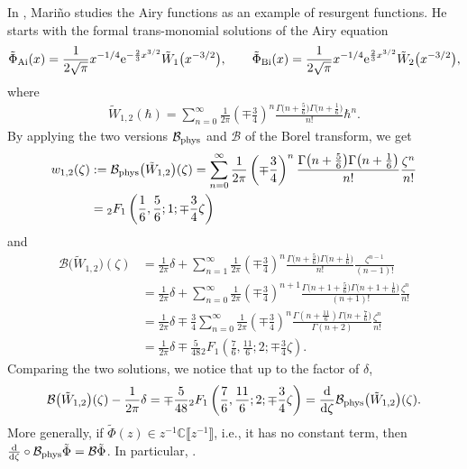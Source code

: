 \documentclass[pdftex]{sigma}
\newcommand{\C}{\mathbb{C}}
\newcommand{\series}[1]{\tilde{#1}}
\newcommand{\borel}{\mathcal{B}}
\numberwithin{equation}{section}
\begin{document}
In \cite{lectures-Marino}, Mari\~{n}o studies the Airy functions as an example of resurgent functions. He starts with the formal trans-monomial solutions of the Airy equation
\begin{align*}
\series{\Phi}_{\mathrm{Ai}}(x)=\frac{1}{2\sqrt{\pi}}x^{-1/4}{\rm e}^{-\frac{2}{3}x^{3/2}}\tilde{W}_1\bigl(x^{-3/2}\bigr),\qquad
\series{\Phi}_{\mathrm{Bi}}(x)=\frac{1}{2\sqrt{\pi}}x^{-1/4}{\rm e}^{\frac{2}{3}x^{3/2}}\tilde{W}_2\bigl(x^{-3/2}\bigr),
\end{align*}
where
\begin{align*}
\tilde{W}_{1,2}(\hbar)=\sum_{n=0}^{\infty}\frac{1}{2\pi}\left(\mp\frac{3}{4}\right)^{n}\frac{\Gamma\bigl(n+\frac{5}{6}\bigr)\Gamma\bigl(n+\frac{1}{6}\bigr)}{n!}\hbar^n.
\end{align*}
By applying the two versions $\borel_{{\rm phys}}$ and $\borel$ of the Borel transform, we get
\begin{align*}
w_{1,2}(\zeta)&:=\borel_{{\rm phys}}\bigl(\tilde{W}_{1,2}\bigr)(\zeta)=\sum_{n=0}^{\infty}\frac{1}{2\pi}\left(\mp\frac{3}{4}\right)^{n}\frac{\Gamma\bigl(n+\frac{5}{6}\bigr)\Gamma\bigl(n+\frac{1}{6}\bigr)}{n!}\frac{\zeta^n}{n!}\\
&={}_2F_1\left(\frac{1}{6},\frac{5}{6};1;\mp\frac{3}{4}\zeta\right)
\end{align*}
and
\begin{align*}
\borel\bigl(\tilde{W}_{1,2}\bigr)(\zeta)&=\frac{1}{2\pi}\delta+\sum_{n=1}^{\infty} \frac{1}{2\pi}\left(\mp\frac{3}{4}\right)^{n}\frac{\Gamma\bigl(n+\frac{5}{6}\bigr)\Gamma\bigl(n+\frac{1}{6}\bigr)}{n!}\frac{\zeta^{n-1}}{(n-1)!}\\
&=\frac{1}{2\pi}\delta+\sum_{n=0}^{\infty} \frac{1}{2\pi}\left(\mp\frac{3}{4}\right)^{n+1}\frac{\Gamma\bigl(n+1+\frac{5}{6}\bigr)\Gamma\bigl(n+1+\frac{1}{6}\bigr)}{(n+1)!}\frac{\zeta^{n}}{n!}\\
&=\frac{1}{2\pi}\delta\mp\frac{3}{4}\sum_{n=0}^{\infty} \frac{1}{2\pi}\left(\mp\frac{3}{4}\right)^{n}\frac{\Gamma(n+\frac{11}{6})\Gamma\bigl(n+\frac{7}{6}\bigr)}{\Gamma(n+2)}\frac{\zeta^{n}}{n!}\\
&=\frac{1}{2\pi}\delta\mp\frac{5}{48} {}_2F_1\left(\frac{7}{6},\frac{11}{6};2;\mp\frac{3}{4}\zeta\right).
\end{align*}
Comparing the two solutions, we notice that up to the factor of $\delta$,
\begin{equation}\label{Borel-W12}
\borel\bigl(\tilde{W}_{1,2}\bigr)(\zeta)-\frac{1}{2\pi}\delta=\mp \frac{5}{48} {}_2F_1\left(\frac{7}{6},\frac{11}{6};2;\mp\frac{3}{4}\zeta\right)=\frac{\rm d}{{\rm d}\zeta}\borel_{{\rm phys}}\bigl(\tilde{W}_{1,2}\bigr)(\zeta).
\end{equation}
More generally, if $\series{\Phi}(z)\in z^{-1}\C \big\llbracket z^{-1} \big\rrbracket$, i.e., it has no constant term, then
$
\frac{\rm d}{{\rm d}\zeta}\circ\borel_{{\rm phys}}\series{\Phi}=\borel\series{\Phi}$.
In particular, \smash{$\frac{\rm d}{{\rm d}\zeta}\circ\borel_{{\rm phys}}\bigl[z^{-1/2}\tilde{W}_{1}\bigr]\left(\frac{2}{3}\zeta\right)=v_1(\zeta)$}.
%
\end{document}
